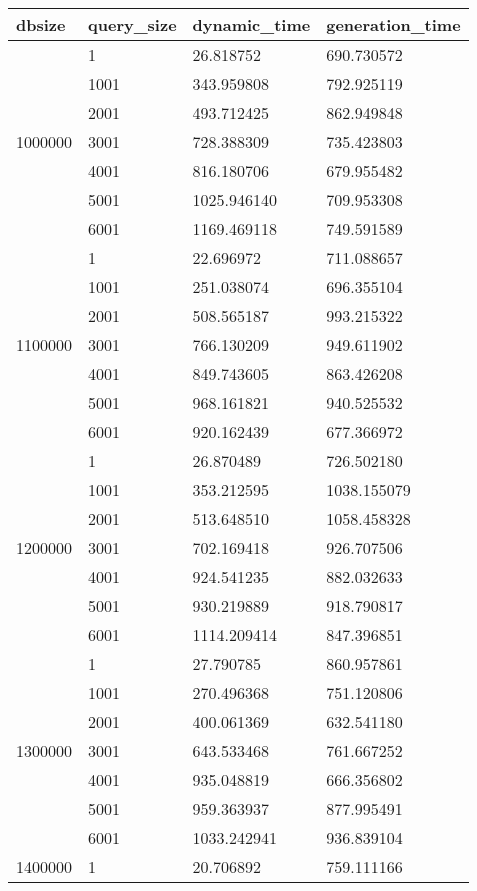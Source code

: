 \begin{table}[htb!]
\centering
\begin{tabular}{llll}
\toprule
dbsize & query_size & dynamic_time & generation_time \\
\midrule
\multirow[c]{7}{*}{1000000} & 1 & 26.818752 & 690.730572 \\
 & 1001 & 343.959808 & 792.925119 \\
 & 2001 & 493.712425 & 862.949848 \\
 & 3001 & 728.388309 & 735.423803 \\
 & 4001 & 816.180706 & 679.955482 \\
 & 5001 & 1025.946140 & 709.953308 \\
 & 6001 & 1169.469118 & 749.591589 \\
\multirow[c]{7}{*}{1100000} & 1 & 22.696972 & 711.088657 \\
 & 1001 & 251.038074 & 696.355104 \\
 & 2001 & 508.565187 & 993.215322 \\
 & 3001 & 766.130209 & 949.611902 \\
 & 4001 & 849.743605 & 863.426208 \\
 & 5001 & 968.161821 & 940.525532 \\
 & 6001 & 920.162439 & 677.366972 \\
\multirow[c]{7}{*}{1200000} & 1 & 26.870489 & 726.502180 \\
 & 1001 & 353.212595 & 1038.155079 \\
 & 2001 & 513.648510 & 1058.458328 \\
 & 3001 & 702.169418 & 926.707506 \\
 & 4001 & 924.541235 & 882.032633 \\
 & 5001 & 930.219889 & 918.790817 \\
 & 6001 & 1114.209414 & 847.396851 \\
\multirow[c]{7}{*}{1300000} & 1 & 27.790785 & 860.957861 \\
 & 1001 & 270.496368 & 751.120806 \\
 & 2001 & 400.061369 & 632.541180 \\
 & 3001 & 643.533468 & 761.667252 \\
 & 4001 & 935.048819 & 666.356802 \\
 & 5001 & 959.363937 & 877.995491 \\
 & 6001 & 1033.242941 & 936.839104 \\
\multirow[c]{7}{*}{1400000} & 1 & 20.706892 & 759.111166 \\

\end{tabular}
\end{table}
